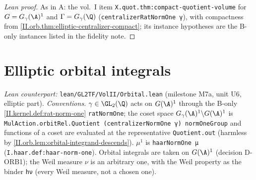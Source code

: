 \begin{proof}[Lean proof]
As in A: the vol.~I item \texttt{X.quot.thm:compact-quotient-volume} for $G=G_\gamma(\A)^1$ and $\Gamma=G_\gamma(\Q)$ (\texttt{centralizerRatNormOne γ}), with compactness from \cref{II.orb.thm:elliptic-centralizer-compact}; its instance hypotheses are the B-only instances listed in the fidelity note.
\end{proof}

\section{Elliptic orbital integrals}\label{sec:orb-elliptic}

\noindent\emph{Lean counterpart:} \texttt{lean/GL2TF/VolII/Orbital.lean} (milestone M7a, unit U6, elliptic part). \emph{Conventions.} $\gamma\in\GL_2(\Q)$ acts on
$G(\A)^1$ through the B-only \cref{II.kernel.def:rat-norm-one} \texttt{ratNormOne}; the coset space $G_\gamma(\A)^1\backslash G(\A)^1$ is
\texttt{MulAction.orbitRel.Quotient (centralizerNormOne γ) normOneGroup} and functions of a coset are evaluated at the representative \texttt{Quotient.out}
(harmless by \cref{II.orb.lem:orbital-integrand-descends}). $\mu^1$ is \texttt{haarNormOne μ} (\texttt{I.haar.def:haar-norm-one}). Orbital integrals are taken on
$G(\A)^1$ (decision D-ORB1); the Weil measure $\nu$ is an arbitrary one, with the Weil property as the binder \texttt{hν} (every Weil measure, not a chosen one).

